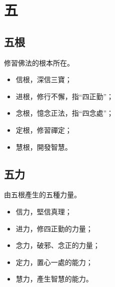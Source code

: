 \section{五}

\subsection{五根}
修習佛法的根本所在。
\begin{itemize}
  \item 信根，深信三寶；
  \item 进根，修行不懈，指“四正勤”；
  \item 念根，憶念正法，指“四念處”；
  \item 定根，修習禪定；
  \item 慧根，開發智慧。
\end{itemize}

\subsection{五力}
由五根產生的五種力量。
\begin{itemize}
  \item 信力，堅信真理；
  \item 进力，修四正勤的力量；
  \item 念力，破邪、念正的力量；
  \item 定力，置心一處的能力；
  \item 慧力，產生智慧的能力。
\end{itemize}
